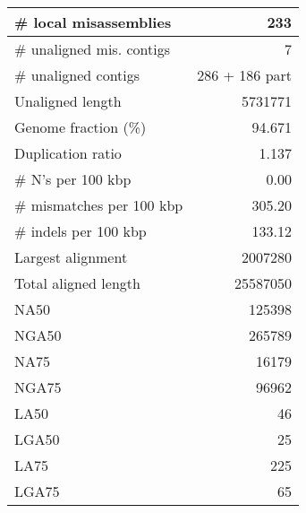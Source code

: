 \documentclass[12pt,a4paper]{article}
\begin{document}
\begin{table}[ht]
\begin{center}
\begin{tabular}{|l*{1}{|r}|}
\# local misassemblies & 233 \\ \hline
\# unaligned mis. contigs & 7 \\ \hline
\# unaligned contigs & 286 + 186 part \\ \hline
Unaligned length & 5731771 \\ \hline
Genome fraction (\%) & 94.671 \\ \hline
Duplication ratio & 1.137 \\ \hline
\# N's per 100 kbp & 0.00 \\ \hline
\# mismatches per 100 kbp & 305.20 \\ \hline
\# indels per 100 kbp & 133.12 \\ \hline
Largest alignment & 2007280 \\ \hline
Total aligned length & 25587050 \\ \hline
NA50 & 125398 \\ \hline
NGA50 & 265789 \\ \hline
NA75 & 16179 \\ \hline
NGA75 & 96962 \\ \hline
LA50 & 46 \\ \hline
LGA50 & 25 \\ \hline
LA75 & 225 \\ \hline
LGA75 & 65 \\ \hline
\end{tabular}
\end{center}
\end{table}
\end{document}
